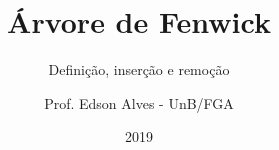 \title{Árvore de Fenwick}
\subtitle{Definição, inserção e remoção}
\author{Prof. Edson Alves - UnB/FGA}
\date{2019}
